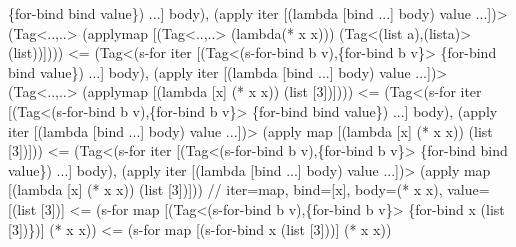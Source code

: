 \begin{Codes}
             \{for-bind bind value\}) ...]
           body),
         (apply iter [(lambda [bind ...] body) value ...])>
      (Tag<..,..> (apply\C map [(Tag<..,..> (lambda\C [x] (* x x)))
        (Tag<(list a),(list\C a)> (list\C [3]))])))
<= (Tag<(s-for iter
         [(Tag<(s-for-bind b v),\{for-bind b v\}>
             \{for-bind bind value\}) ...]
           body),
         (apply iter [(lambda [bind ...] body) value ...])>
      (Tag<..,..> (apply\C map [(lambda [x] (* x x))
        (list [3])])))
<= (Tag<(s-for iter
         [(Tag<(s-for-bind b v),\{for-bind b v\}>
             \{for-bind bind value\}) ...]
           body),
         (apply iter [(lambda [bind ...] body) value ...])>
      (apply map [(lambda [x] (* x x)) (list [3])]))
<= (Tag<(s-for iter
         [(Tag<(s-for-bind b v),\{for-bind b v\}>
             \{for-bind bind value\}) ...]
           body),
         (apply iter [(lambda [bind ...] body) value ...])>
      (apply map [(lambda [x] (* x x)) (list [3])]))
  // iter=map, bind=[x], body=(* x x), value=[(list [3])]
<= (s-for map
     [(Tag<(s-for-bind b v),\{for-bind b v\}>
        \{for-bind x (list [3])\})]
     (* x x))
<= (s-for map
     [(s-for-bind x (list [3]))]
     (* x x))
\end{Codes}

